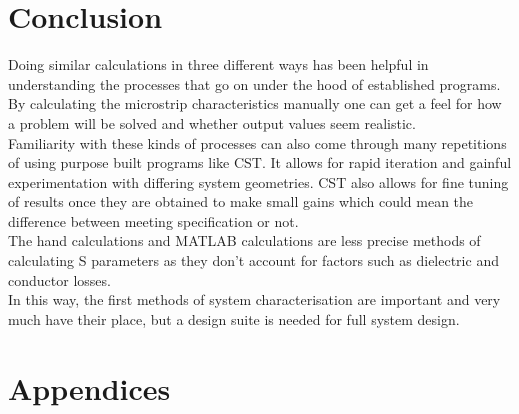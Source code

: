 \documentclass{paper}
\begin{document}
\newpage
\section{Conclusion}
Doing similar calculations in three different ways has been helpful in understanding the processes that go on under the hood of established programs. By calculating the microstrip characteristics manually one can get a feel for how a problem will be solved and whether output values seem realistic. \\

Familiarity with these kinds of processes can also come through many repetitions of using purpose built programs like CST. It allows for rapid iteration and gainful experimentation with differing system geometries. CST also allows for fine tuning of results once they are obtained to make small gains which could mean the difference between meeting specification or not.\\

The hand calculations and MATLAB calculations are less precise methods of calculating S parameters as they don't account for factors such as dielectric and conductor losses. \\

In this way, the first methods of system characterisation are important and very much have their place, but a design suite is needed for full system design.

\newpage
\section{Appendices}
\end{document}
